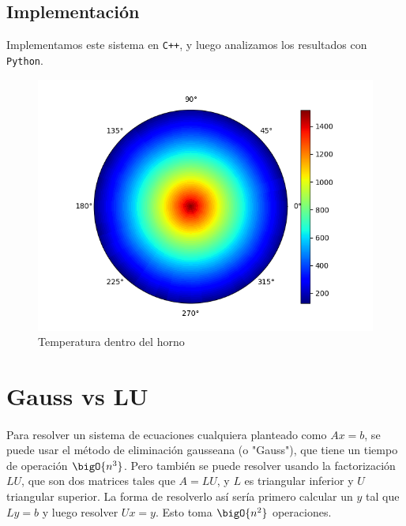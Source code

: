 \documentclass[12pt]{article}
\begin{document}
\subsection{Implementación}

Implementamos este sistema en \texttt{C++}, y luego analizamos los resultados con \texttt{Python}.

\begin{figure}[H]
\centering
\includegraphics[width=\textwidth]{test.0}
\caption{Temperatura dentro del horno}
\label{fig:temperature}
\end{figure}


\section{Gauss vs LU}

\paragraph{} Para resolver un sistema de ecuaciones cualquiera planteado como \(Ax = b\), se puede usar el método de eliminación gausseana (o "Gauss"), que tiene un tiempo de operación \(\bigO{n^3}\). Pero también se puede resolver usando la factorización \(LU\), que son dos matrices tales que \(A = LU\), y \(L\) es triangular inferior y \(U\) triangular superior. La forma de resolverlo así sería primero calcular un \(y\) tal que \(Ly = b\) y luego resolver \(Ux = y\). Esto toma \(\bigO{n^2}\) operaciones.
\end{document}
